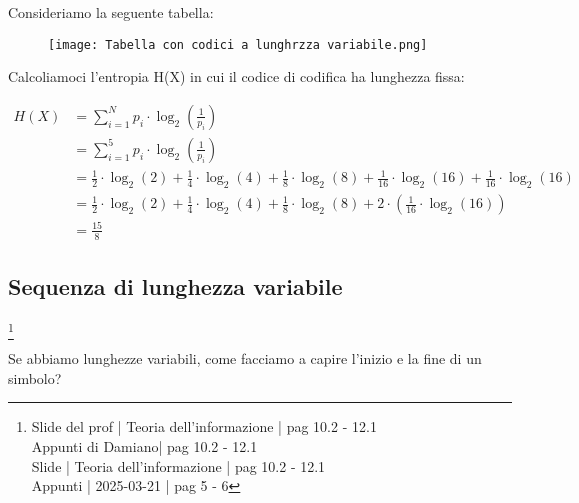 Consideriamo la seguente tabella: 

\begin{figure}[h]
    \centering
    \texttt{[image: Tabella con codici a lunghrzza variabile.png]}
\end{figure} 

Calcoliamoci l'entropia H(X) in cui il codice di codifica ha lunghezza fissa: 

{
    \Large
    \begin{equation}
        \begin{split}
            H (X)
            &= 
            \sum_{i = 1}^{N}
            p_i \cdot \log_{2} \left( \frac{1}{p_i}\right) 
            \\
            &= 
            \sum_{i = 1}^{5}
            p_i \cdot \log_{2} \left( \frac{1}{p_i}\right) 
            \\
            &= 
            \frac{1}{2} \cdot \log_2 (2) 
            +
            \frac{1}{4} \cdot \log_2 (4) 
            +
            \frac{1}{8} \cdot \log_2 (8) 
            +
            \frac{1}{16} \cdot \log_2 (16) 
            +
            \frac{1}{16} \cdot \log_2 (16)
            \\
            &= 
            \frac{1}{2} \cdot \log_2 (2) 
            +
            \frac{1}{4} \cdot \log_2 (4) 
            +
            \frac{1}{8} \cdot \log_2 (8) 
            +
            2 \cdot 
            \left(
            \frac{1}{16} \cdot \log_2 (16)
            \right)
            \\
            &=
            \frac{15}{8}
        \end{split}
    \end{equation}
}

\newpage 

\subsection{Sequenza di lunghezza variabile}
\footnote{Slide del prof | Teoria dell'informazione | pag 10.2 - 12.1 \\  
Appunti di Damiano| pag 10.2 - 12.1 \\
Slide | Teoria dell'informazione | pag 10.2 - 12.1 \\
Appunti | 2025-03-21 | pag 5 - 6
}

Se abbiamo lunghezze variabili, come facciamo a capire l'inizio e la fine di un simbolo? \newline 

